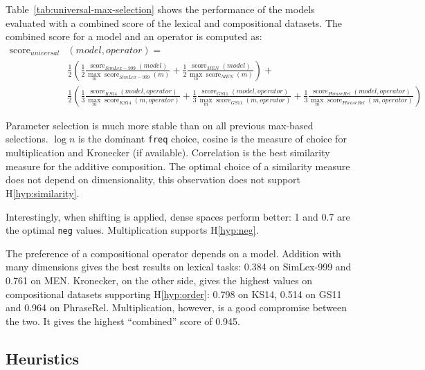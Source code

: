 Table~\ref{tab:universal-max-selection} shows the performance of the models evaluated with a combined score of the lexical and compositional datasets. The combined score for a model and an operator is computed as:
%
\scriptsize
\begin{align*}
\operatorname{score}_\mathit{universal}&(\mathit{model}, \mathit{operator}) =\\%
& \frac{1}{2}\left(
\frac{1}{2}%
\frac{\operatorname{score}_\mathit{SimLex-999}(\mathit{model})}%
{\max_m\operatorname{score}_\mathit{SimLex-999}(m)}%
+%
\frac{1}{2}%
\frac{\operatorname{score}_\mathit{MEN}(\mathit{model})}%
{\max_m\operatorname{score}_\mathit{MEN}(m)}%
\right) +
\\
&\frac{1}{2}\left(
\frac{1}{3}%
\frac{\operatorname{score}_\mathit{KS14}(\mathit{model}, \mathit{operator})}%
{\max_m\operatorname{score}_\mathit{KS14}(m, \mathit{operator})}%
+%
\frac{1}{3}%
\frac{\operatorname{score}_\mathit{GS11}(\mathit{model}, \mathit{operator})}%
{\max_m\operatorname{score}_\mathit{GS11}(m, \mathit{operator})}%
+%
\frac{1}{3}%
\frac{\operatorname{score}_\mathit{PhraseRel}(\mathit{model, \mathit{operator}})}%
{\max_m\operatorname{score}_\mathit{PhraseRel}(m, \mathit{operator})}%
\right)
\end{align*}
\normalsize

Parameter selection is much more stable than on all previous max-based selections. $\log n$ is the dominant \texttt{freq} choice, cosine is the measure of choice for multiplication and Kronecker (if available). Correlation is the best similarity measure for the additive composition. The optimal choice of a similarity measure does not depend on dimensionality, this observation does not support H\ref{hyp:similarity}.

Interestingly, when shifting is applied, dense spaces perform better: 1 and 0.7 are the optimal \texttt{neg} values. Multiplication  supports H\ref{hyp:neg}.

The preference of a compositional operator depends on a model. Addition with many dimensions gives the best results on lexical tasks: 0.384 on SimLex-999 and 0.761 on MEN. Kronecker, on the other side, gives the highest values on compositional datasets supporting H\ref{hyp:order}: 0.798 on KS14, 0.514 on GS11 and 0.964 on PhraseRel. Multiplication, however, is a good compromise between the two. It gives the highest ``combined'' score of 0.945.

\subsection{Heuristics}
\label{sec:heuristics-universal}

